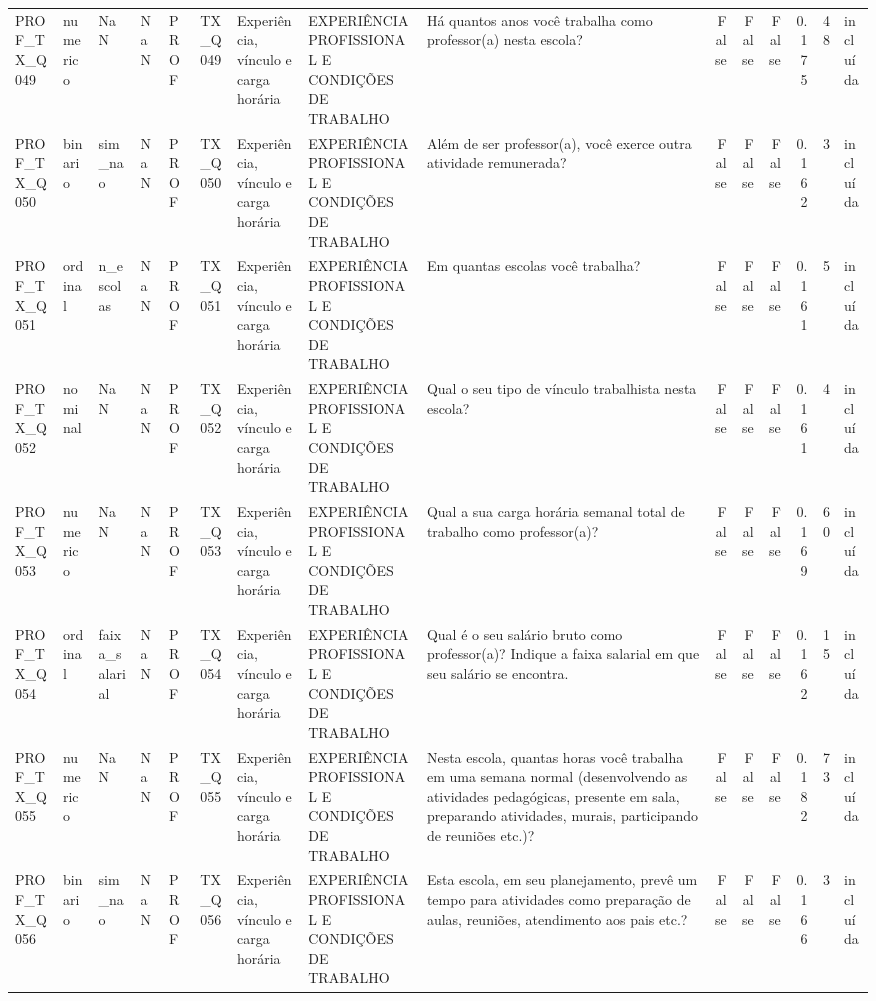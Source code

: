 \begin{tabular}{lllllllllrrrrrl}
PROF\_TX\_Q049 & numerico & NaN & NaN & PROF & TX\_Q049 & Experiência, vínculo e carga horária & EXPERIÊNCIA PROFISSIONAL E CONDIÇÕES DE TRABALHO & Há quantos anos você trabalha como professor(a) nesta escola? & False & False & False & 0.175 & 48 & incluída \\
PROF\_TX\_Q050 & binario & sim\_nao & NaN & PROF & TX\_Q050 & Experiência, vínculo e carga horária & EXPERIÊNCIA PROFISSIONAL E CONDIÇÕES DE TRABALHO & Além de ser professor(a), você exerce outra atividade remunerada? & False & False & False & 0.162 & 3 & incluída \\
PROF\_TX\_Q051 & ordinal & n\_escolas & NaN & PROF & TX\_Q051 & Experiência, vínculo e carga horária & EXPERIÊNCIA PROFISSIONAL E CONDIÇÕES DE TRABALHO & Em quantas escolas você trabalha? & False & False & False & 0.161 & 5 & incluída \\
PROF\_TX\_Q052 & nominal & NaN & NaN & PROF & TX\_Q052 & Experiência, vínculo e carga horária & EXPERIÊNCIA PROFISSIONAL E CONDIÇÕES DE TRABALHO & Qual o seu tipo de vínculo trabalhista nesta escola? & False & False & False & 0.161 & 4 & incluída \\
PROF\_TX\_Q053 & numerico & NaN & NaN & PROF & TX\_Q053 & Experiência, vínculo e carga horária & EXPERIÊNCIA PROFISSIONAL E CONDIÇÕES DE TRABALHO & Qual a sua carga horária semanal total de trabalho como professor(a)? & False & False & False & 0.169 & 60 & incluída \\
PROF\_TX\_Q054 & ordinal & faixa\_salarial & NaN & PROF & TX\_Q054 & Experiência, vínculo e carga horária & EXPERIÊNCIA PROFISSIONAL E CONDIÇÕES DE TRABALHO & Qual é o seu salário bruto como professor(a)? Indique a faixa salarial em que seu salário se encontra. & False & False & False & 0.162 & 15 & incluída \\
PROF\_TX\_Q055 & numerico & NaN & NaN & PROF & TX\_Q055 & Experiência, vínculo e carga horária & EXPERIÊNCIA PROFISSIONAL E CONDIÇÕES DE TRABALHO & Nesta escola, quantas horas você trabalha em uma semana normal (desenvolvendo as atividades pedagógicas, presente em sala, preparando atividades, murais, participando de reuniões etc.)? & False & False & False & 0.182 & 73 & incluída \\
PROF\_TX\_Q056 & binario & sim\_nao & NaN & PROF & TX\_Q056 & Experiência, vínculo e carga horária & EXPERIÊNCIA PROFISSIONAL E CONDIÇÕES DE TRABALHO & Esta escola, em seu planejamento, prevê um tempo para atividades como preparação de aulas, reuniões, atendimento aos pais etc.? & False & False & False & 0.166 & 3 & incluída \\

\end{tabular}
